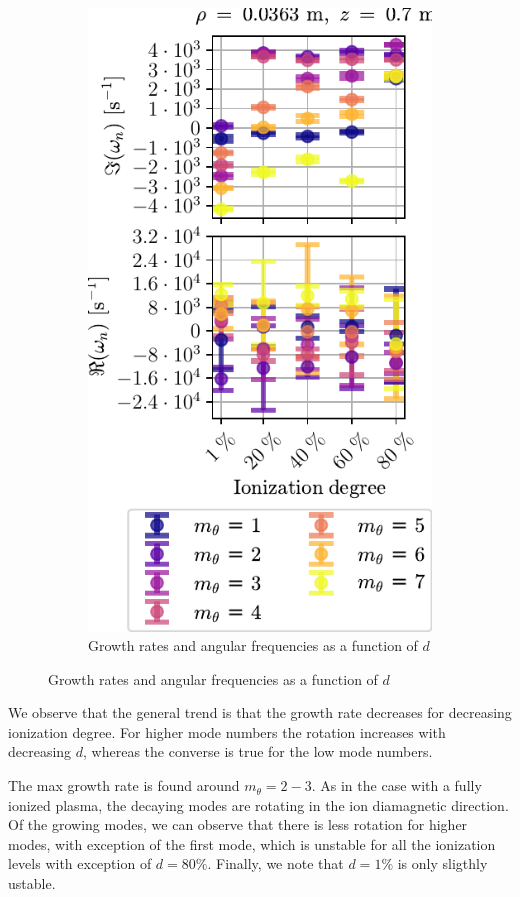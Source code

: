 \begin{figure}[htbp]
\begin{subfigure}[h]{0.45\textwidth}
       \includegraphics{fig/results/neutral/growthRatesNnModes}
       \caption{Growth rates and angular frequencies as a function of $d$}
       \label{fig:grNnModeNr}
    \end{subfigure}
\end{figure}
%
We observe that the general trend is that the growth rate decreases for decreasing ionization degree.
For higher mode numbers the rotation increases with decreasing $d$, whereas the converse is true for the low mode numbers.

The max growth rate is found around $m_\theta=2-3$.
As in the case with a fully ionized plasma, the decaying modes are rotating in the ion diamagnetic direction.
Of the growing modes, we can observe that there is less rotation for higher modes, with exception of the first mode, which is unstable for all the ionization levels with exception of $d=80\%$.
Finally, we note that $d=1\%$ is only sligthly ustable.


